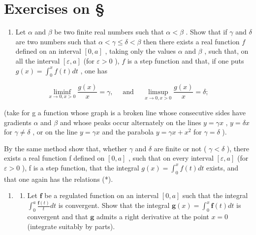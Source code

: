 \section*{Exercises on \S{}}
{}

\begin{enumerate}
\def\labelenumi{\arabic{enumi})}
\tightlist
\item
  Let \(\alpha\) and \(\beta\) be two finite real numbers such that \(\alpha < \beta\) . Show that if \(\gamma\) and \(\delta\) are two numbers such that \(\alpha < \gamma \leqslant \delta < \beta\) then there exists a real function \(f\) defined on an interval \([0, a]\) , taking only the values \(\alpha\) and \(\beta\) , such that, on all the interval \([\varepsilon, a]\) (for \(\varepsilon > 0\) ), \(f\) is a step function and that, if one puts \(g(x) = \int_0^x f(t)dt\) , one has
\end{enumerate}

\[
\liminf _ {x \to 0,   x > 0} \frac {g (x)}{x} = \gamma , \quad \text { and } \quad \limsup _ {x \to 0,   x > 0} \frac {g (x)}{x} = \delta ;\tag{*}
\]

(take for g a function whose graph is a broken line whose consecutive sides have gradients \(\alpha\) and \(\beta\) and whose peaks occur alternately on the lines \(y = \gamma x\) , \(y = \delta x\) for \(\gamma \neq \delta\) , or on the line \(y = \gamma x\) and the parabola \(y = \gamma x + x^{2}\) for \(\gamma = \delta\) ).

By the same method show that, whether \(\gamma\) and \(\delta\) are finite or not ( \(\gamma < \delta\) ), there exists a real function f defined on \([0, a]\) , such that on every interval \([\varepsilon, a]\) (for \(\varepsilon > 0\) ), f is a step function, that the integral \(g(x) = \int_{0}^{x} f(t) dt\) exists, and that one again has the relations (*).

\begin{enumerate}
\def\labelenumi{\arabic{enumi})}
\setcounter{enumi}{1}
\tightlist
\item
  \begin{enumerate}
  \def\labelenumii{\alph{enumii})}
  \tightlist
  \item
    Let \(\mathbf{f}\) be a regulated function on an interval \([0, a]\) such that the integral \(\int_0^a \frac{\mathbf{f}(t)}{t} dt\) is convergent. Show that the integral \(\mathbf{g}(x) = \int_0^x \mathbf{f}(t) dt\) is convergent and that \(\mathbf{g}\) admits a right derivative at the point \(x = 0\) (integrate suitably by parts).
  \end{enumerate}
\end{enumerate}

